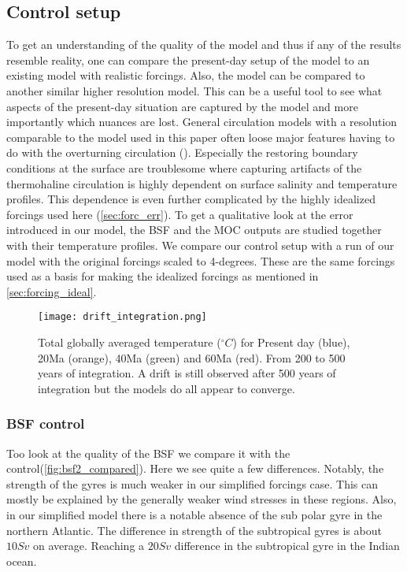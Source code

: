 \subsection{Control setup}


To get an understanding of the quality of the model and thus if any of the results resemble reality, one can compare the present-day setup of the model to an existing model with realistic forcings. Also, the model can be compared to another similar higher resolution model. This can be a useful tool to see what aspects of the present-day situation are captured by the model and more importantly which nuances are lost. General circulation models with a resolution comparable to the model used in this paper often loose major features having to do with the overturning circulation (\cite{stone1990limitations}). Especially the restoring boundary conditions at the surface are troublesome where capturing artifacts of the thermohaline circulation is highly dependent on surface salinity and temperature profiles. This dependence is even further complicated by the highly idealized forcings used here (\cref{sec:forc_err}). To get a qualitative look at the error introduced in our model, the BSF and the MOC outputs are studied together with their temperature profiles. We compare our control setup with a run of our model with the original \cite{ECMWFForc} forcings scaled to 4-degrees. These are the same forcings used as a basis for making the idealized forcings as mentioned in \cref{sec:forcing_ideal}.
\begin{figure}[H]
	\texttt{[image: drift\_integration.png]}
	\caption{Total globally averaged temperature ($^{\circ}C$) for Present day (blue), 20Ma (orange), 40Ma (green) and 60Ma (red). From 200 to 500 years of integration. A drift is still observed after 500 years of integration but the models do all appear to converge.}
	\label{fig:avtempgrph}
\end{figure}
\subsubsection{BSF control}
Too look at the quality of the BSF we compare it with the control(\cref{fig:bsf2_compared}). Here we see quite a few differences. Notably, the strength of the gyres is much weaker in our simplified forcings case. This can mostly be explained by the generally weaker wind stresses in these regions. Also, in our simplified model there is a notable absence of the sub polar gyre in the northern Atlantic. The difference in strength of the subtropical gyres is about $10Sv$ on average. Reaching a $20 Sv$ difference in the subtropical gyre in the Indian ocean. 


